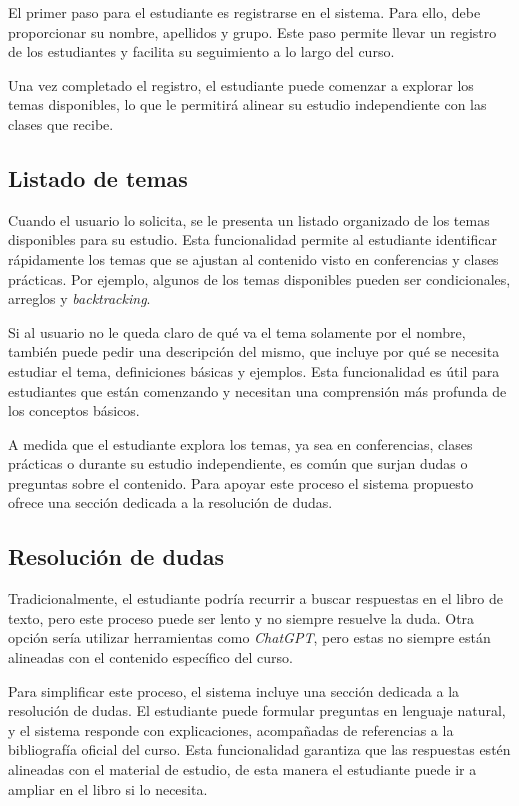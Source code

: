 \documentclass{article}
\begin{document}
El primer paso para el estudiante es registrarse en el sistema. Para ello, debe proporcionar su nombre, apellidos y grupo. Este paso permite llevar un registro de los estudiantes y facilita su seguimiento a lo largo del curso. 

Una vez completado el registro, el estudiante puede comenzar a explorar los temas disponibles, lo que le permitirá alinear su estudio independiente con las clases que recibe.

\subsection{Listado de temas}

Cuando el usuario lo solicita, se le presenta un listado organizado de los temas disponibles para su estudio. Esta funcionalidad permite al estudiante identificar rápidamente los temas que se ajustan al contenido visto en conferencias y clases prácticas. Por ejemplo, algunos de los temas disponibles pueden ser condicionales, arreglos y \textit{backtracking}.

Si al usuario no le queda claro de qué va el tema solamente por el nombre, también puede pedir una descripción del mismo, que incluye por qué se necesita estudiar el tema, definiciones básicas y ejemplos. Esta funcionalidad es útil para estudiantes que están comenzando y necesitan una comprensión más profunda de los conceptos básicos.

A medida que el estudiante explora los temas, ya sea en conferencias, clases prácticas o durante su estudio independiente, es común que surjan dudas o preguntas sobre el contenido. Para apoyar este proceso el sistema propuesto ofrece una sección dedicada a la resolución de dudas.

\subsection{Resolución de dudas}

Tradicionalmente, el estudiante podría recurrir a buscar respuestas en el libro de texto, pero este proceso puede ser lento y no siempre resuelve la duda. Otra opción sería utilizar herramientas como \textit{ChatGPT}, pero estas no siempre están alineadas con el contenido específico del curso.

Para simplificar este proceso, el sistema incluye una sección dedicada a la resolución de dudas. El estudiante puede formular preguntas en lenguaje natural, y el sistema responde con explicaciones, acompañadas de referencias a la bibliografía oficial del curso. Esta funcionalidad garantiza que las respuestas estén alineadas con el material de estudio, de esta manera el estudiante puede ir a ampliar en el libro si lo necesita.
\end{document}
